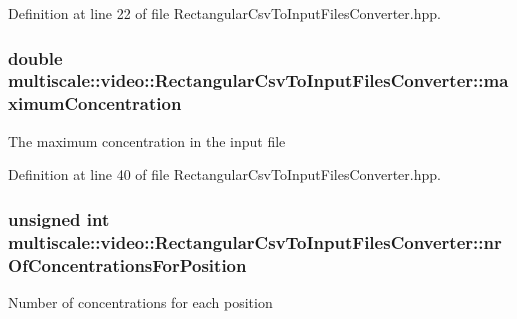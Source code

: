 \-Definition at line 22 of file \-Rectangular\-Csv\-To\-Input\-Files\-Converter.\-hpp.

\hypertarget{classmultiscale_1_1video_1_1RectangularCsvToInputFilesConverter_aeddcdf92c6f79bf41546fd417d0808b1}{
\subsubsection[{maximum\-Concentration}]{\setlength{\rightskip}{0pt plus 5cm}double {\bf multiscale\-::video\-::\-Rectangular\-Csv\-To\-Input\-Files\-Converter\-::maximum\-Concentration}}}\label{classmultiscale_1_1video_1_1RectangularCsvToInputFilesConverter_aeddcdf92c6f79bf41546fd417d0808b1}
\-The maximum concentration in the input file 

\-Definition at line 40 of file \-Rectangular\-Csv\-To\-Input\-Files\-Converter.\-hpp.

\hypertarget{classmultiscale_1_1video_1_1RectangularCsvToInputFilesConverter_a0bfea1eb0f7dc76deee05af1e2eb744b}{
\subsubsection[{nr\-Of\-Concentrations\-For\-Position}]{\setlength{\rightskip}{0pt plus 5cm}unsigned int {\bf multiscale\-::video\-::\-Rectangular\-Csv\-To\-Input\-Files\-Converter\-::nr\-Of\-Concentrations\-For\-Position}}}\label{classmultiscale_1_1video_1_1RectangularCsvToInputFilesConverter_a0bfea1eb0f7dc76deee05af1e2eb744b}
\-Number of concentrations for each position 

